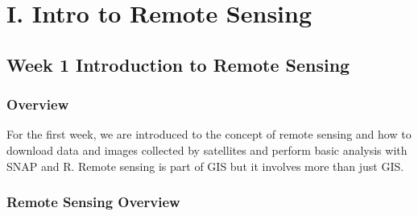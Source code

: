\documentclass[
  letterpaper,
  DIV=11,
  numbers=noendperiod]{scrreprt}
\begin{document}
\part{I. Intro to Remote Sensing}

\hypertarget{week-1-introduction-to-remote-sensing}{%
\chapter*{Week 1 Introduction to Remote
Sensing}\label{week-1-introduction-to-remote-sensing}}


\hypertarget{overview-1}{%
\section*{Overview}\label{overview-1}}


For the first week, we are introduced to the concept of remote sensing
and how to download data and images collected by satellites and perform
basic analysis with SNAP and R. Remote sensing is part of GIS but it
involves more than just GIS.

\hypertarget{remote-sensing-overview}{%
\section*{Remote Sensing Overview}\label{remote-sensing-overview}}

\end{document}
